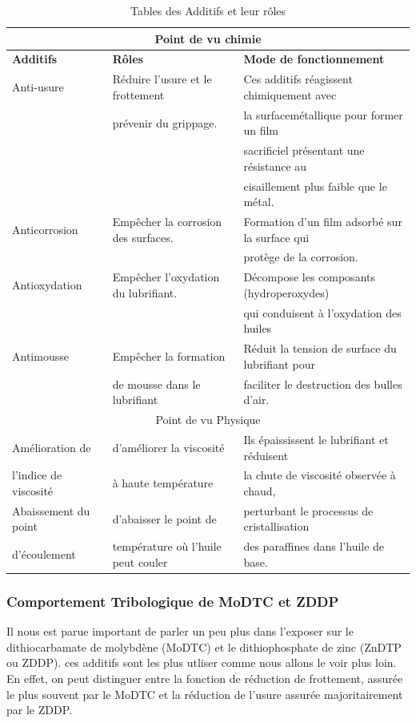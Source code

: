 \begin{table}[h!]
	\begin{tabular}{ l l l }
		\hline
		\multicolumn{3}{c}{Point de vu chimie} \\
		\hline
		\textbf{Additifs}	&\textbf{Rôles}  			    &\textbf{Mode de fonctionnement}  \\
		\hline
		Anti-usure	&Réduire l’usure et le frottement&Ces additifs réagissent chimiquement avec \\
		&prévenir du grippage.			 &la surfacemétallique pour former un film \\
		&						&sacrificiel présentant une résistance au \\
		&						&cisaillement plus faible que le métal.  \\
		\hline
		Anticorrosion&Empêcher la corrosion des surfaces. &  Formation d’un film adsorbé sur la surface qui\\
		&								   &protège de la corrosion.\\
		\hline
		Antioxydation&Empêcher l’oxydation du lubrifiant.  &Décompose les composants (hydroperoxydes)\\
			&&qui conduisent à l’oxydation des huiles  \\
		\hline
		Antimousse&Empêcher la formation&Réduit la tension de surface du lubrifiant pour	\\
		&de mousse dans le lubrifiant  &faciliter le destruction des bulles d’air.  \\
		\hline
		\multicolumn{3}{c}{Point de vu Physique} \\
		\hline
		Amélioration de & d’améliorer la viscosité&Ils épaississent le lubrifiant et réduisent \\
		l’indice de viscosité& à haute température 	&la chute de viscosité observée à chaud,\\				
		\hline
		Abaissement du point &d'abaisser le point de &perturbant le processus de cristallisation\\
		d’écoulement & température où l’huile peut couler & des paraffines dans l’huile de base.  \\
		\hline
	
	
	\end{tabular}
	\label{tab:additifs}
	\caption{Tables des Additifs et leur rôles \cite{initiation}}
\end{table}

\subsubsection{Comportement Tribologique de MoDTC et ZDDP}
Il nous est parue important de parler un peu plus dans l'exposer sur le dithiocarbamate de molybdène (MoDTC) et le dithiophosphate de zinc (ZnDTP ou ZDDP). ces additifs sont les plus utliser comme nous allons le voir plus loin. En effet, on peut distinguer entre la fonction de réduction de frottement, assurée le plus souvent par le MoDTC et la réduction de l’usure assurée majoritairement par le ZDDP.\\


